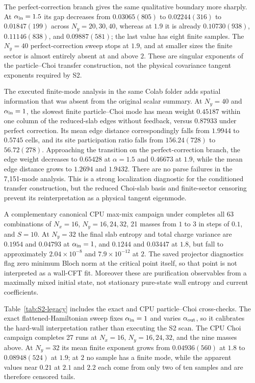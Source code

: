 \documentclass[aps,prx,twocolumn,floatfix,nofootinbib,superscriptaddress,longbibliography]{revtex4-2}
\begin{document}
The perfect-correction branch gives the same qualitative boundary more sharply.  At
$\alpha_{\rm in}=1.5$ its gap decreases from $0.03065(805)$ to $0.02244(316)$ to
$0.01847(199)$ across $N_y=20,30,40$, whereas at $1.9$ it is already
$0.10730(938)$, $0.11146(838)$, and $0.09887(581)$; the last value has eight finite
samples.  The $N_y=40$ perfect-correction sweep stops at $1.9$, and at smaller sizes the
finite sector is almost entirely absent at and above $2$.  These are singular exponents of
the particle--Choi transfer construction, not the physical covariance tangent exponents
required by S2.

The executed finite-mode analysis in the same Colab folder adds spatial information that
was absent from the original scalar summary.  At $N_y=40$ and $\alpha_{\rm in}=1$, the
slowest finite particle--Choi mode has mean weight $0.45187$ within one column of the
reduced-slab edges without feedback, versus $0.87933$ under perfect correction.  Its mean
edge distance correspondingly falls from $1.9944$ to $0.5745$ cells, and its site
participation ratio falls from $156.24(728)$ to $56.72(278)$.  Approaching the transition
on the perfect-correction branch, the edge weight decreases to $0.65428$ at $\alpha=1.5$
and $0.46673$ at $1.9$, while the mean edge distance grows to $1.2694$ and $1.9432$.
There are no parse failures in the 7,151-mode analysis.  This is a strong localization
diagnostic for the conditioned transfer construction, but the reduced Choi-slab basis and
finite-sector censoring prevent its reinterpretation as a physical tangent eigenmode.

A complementary canonical CPU max-mix campaign under
 completes all 63 combinations of $N_x=16$,
$N_y=16,24,32$, 21 masses from $1$ to $3$ in steps of $0.1$, and $S=10$.  At $N_y=32$
the final slab entropy and total charge variance
are $0.1954$ and $0.04793$ at $\alpha_{\rm in}=1$, and $0.1244$ and $0.03447$ at $1.8$,
but fall to approximately $2.04\times10^{-8}$ and $7.9\times10^{-12}$ at $2$.  The saved
projector diagnostics flag zero minimum Bloch norm at the critical point itself, so that
point is not interpreted as a wall-CFT fit.  Moreover these are purification observables
from a maximally mixed initial state, not stationary pure-state wall entropy and current
coefficients.

Table~\ref{tab:S2-legacy} includes the exact and CPU particle--Choi cross-checks.  The exact
flattened-Hamiltonian sweep fixes $\alpha_{\rm in}=1$ and varies $\alpha_{\rm out}$, so it
calibrates the hard-wall interpretation rather than executing the S2 scan.  The CPU Choi
campaign completes 27 runs at $N_x=16$, $N_y=16,24,32$, and the nine masses above.  At
$N_y=32$ its mean finite exponent grows from $0.04936(560)$ at $1.8$ to $0.08948(524)$ at
$1.9$; at $2$ no sample has a finite mode, while the apparent values near $0.21$ at
$2.1$ and $2.2$ each come from only two of ten samples and are therefore censored tails.
\end{document}
